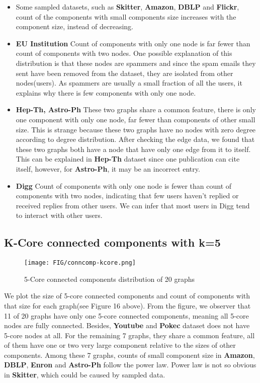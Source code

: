 \begin{itemize}
\item Some sampled datasets, such as \textbf{Skitter}, \textbf{Amazon}, \textbf{DBLP} and \textbf{Flickr}, count of the components with small components size increases with the component size, instead of decreasing.
\item \textbf{EU Institution} Count of components with only one node is far fewer than count of components with two nodes. One possible explanation of this distribution is that these nodes are spammers and since the spam emails they sent have been removed from the dataset, they are isolated from other nodes(users). As spammers are usually a small fraction of all the users, it explains why there is few components with only one node.
\item \textbf{Hep-Th, Astro-Ph} These two graphs share a common feature, there is only one component with only one node, far fewer than components of other small size. This is strange because these two graphs have no nodes with zero degree according to degree distribution. After checking the edge data, we found that these two graphs both have a node that have only one edge from it to itself. This can be explained in \textbf{Hep-Th} dataset since one publication can cite itself, however, for \textbf{Astro-Ph}, it may be an incorrect entry.
\item \textbf{Digg} Count of components with only one node is fewer than count of components with two nodes, indicating that few users haven't replied or received replies from other users. We can infer that most users in Digg tend to interact with other users.
\end{itemize}

\subsection{K-Core connected components with k=5}
\begin{figure}[H]
\begin{center}
\texttt{[image: FIG/conncomp-kcore.png]}
\caption{5-Core connected components distribution of 20 graphs}
\end{center}
\end{figure}

\par We plot the size of 5-core connected components and count of components with that size for each graph(see Figure 16 above). From the figure, we observer that 11 of 20 graphs have only one 5-core connected components, meaning all 5-core nodes are fully connected. Besides, \textbf{Youtube} and \textbf{Pokec} dataset does not have 5-core nodes at all. For the remaining 7 graphs, they share a common feature, all of them have one or two very large component relative to the sizes of other components. Among these 7 graphs, counts of small component size in \textbf{Amazon}, \textbf{DBLP}, \textbf{Enron} and \textbf{Astro-Ph} follow the power law. Power law is not so obvious in \textbf{Skitter}, which could be caused by sampled data.

